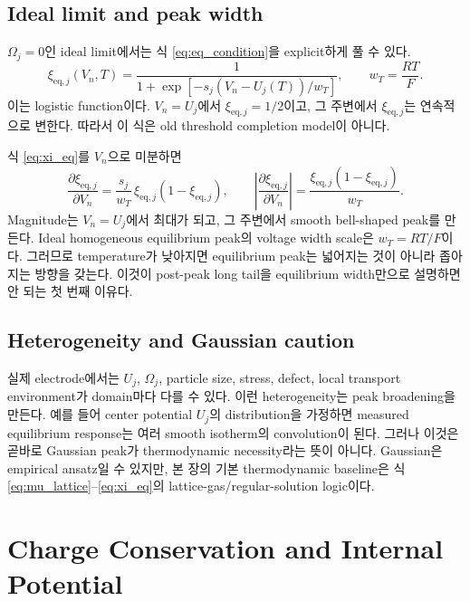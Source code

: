 \documentclass[11pt]{article}
\newcommand{\eq}{\mathrm{eq}}
\begin{document}
\subsection{Ideal limit and peak width}\label{subsec:ideal}

\(\Omega_j=0\)인 ideal limit에서는 식 \eqref{eq:eq_condition}을 explicit하게 풀 수 있다.
\begin{equation}
\boxed{
\xi_{\eq,j}(V_n,T)
=
\frac{1}{1+\exp[-s_j(V_n-U_j(T))/w_T]},
\qquad
w_T=\frac{RT}{F}.
}
\label{eq:xi_eq}
\end{equation}
이는 logistic function이다. \(V_n=U_j\)에서 \(\xi_{\eq,j}=1/2\)이고, 그 주변에서
\(\xi_{\eq,j}\)는 연속적으로 변한다. 따라서 이 식은 old threshold completion model이 아니다.

식 \eqref{eq:xi_eq}를 \(V_n\)으로 미분하면
\begin{equation}
\frac{\partial \xi_{\eq,j}}{\partial V_n}
=
\frac{s_j}{w_T}\,
\xi_{\eq,j}(1-\xi_{\eq,j}),
\qquad
\left|
\frac{\partial \xi_{\eq,j}}{\partial V_n}
\right|
=
\frac{\xi_{\eq,j}(1-\xi_{\eq,j})}{w_T}.
\label{eq:dxi_eq}
\end{equation}
Magnitude는 \(V_n=U_j\)에서 최대가 되고, 그 주변에서 smooth bell-shaped peak를 만든다.
Ideal homogeneous equilibrium peak의 voltage width scale은 \(w_T=RT/F\)이다. 그러므로
temperature가 낮아지면 equilibrium peak는 넓어지는 것이 아니라 좁아지는 방향을 갖는다. 이것이
post-peak long tail을 equilibrium width만으로 설명하면 안 되는 첫 번째 이유다.

\subsection{Heterogeneity and Gaussian caution}\label{subsec:heterogeneity}

실제 electrode에서는 \(U_j\), \(\Omega_j\), particle size, stress, defect, local transport
environment가 domain마다 다를 수 있다. 이런 heterogeneity는 peak broadening을 만든다. 예를 들어
center potential \(U_j\)의 distribution을 가정하면 measured equilibrium response는 여러 smooth
isotherm의 convolution이 된다. 그러나 이것은 곧바로 Gaussian peak가 thermodynamic necessity라는
뜻이 아니다. Gaussian은 empirical ansatz일 수 있지만, 본 장의 기본 thermodynamic baseline은
식 \eqref{eq:mu_lattice}--\eqref{eq:xi_eq}의 lattice-gas/regular-solution logic이다.

\section{Charge Conservation and Internal Potential}\label{sec:charge}
\end{document}
